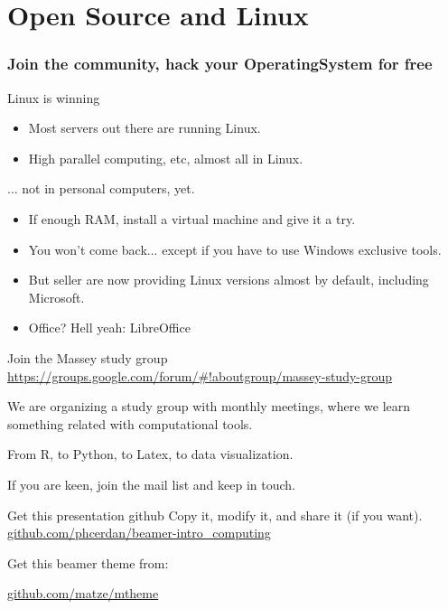 \documentclass[9pt]{beamer}
\begin{document}
\section{Open Source and Linux}
\begin{frame}
  \frametitle{Join the community, hack your OperatingSystem for free}
  \begin{alertblock}{Linux is winning}
    \begin{itemize}
      \item Most servers out there are running Linux.
      \item High parallel computing, etc, almost all in Linux.
    \end{itemize}
  \end{alertblock}
  \begin{alertblock}{... not in personal computers, yet.}
    \begin{itemize}
      \item If enough RAM, install a virtual machine and give it a try.
      \item You won't come back... except if you have to use Windows exclusive tools.
      \item But seller are now providing Linux versions almost by default, including Microsoft.
      \item Office? Hell yeah: LibreOffice
    \end{itemize}
  \end{alertblock}
\end{frame}

\begin{frame}{Join the Massey study group}
  \url{https://groups.google.com/forum/#!aboutgroup/massey-study-group}

  We are organizing a study group with monthly meetings, where we learn something related with computational tools.

  From R, to Python, to Latex, to data visualization.

  If you are keen, join the mail list and keep in touch.

\end{frame}

\begin{frame}{Get this presentation github}
  Copy it, modify it, and share it (if you want). \url{github.com/phcerdan/beamer-intro_computing}

  \vspace{2mm}
  Get this beamer theme from:

  \begin{center}\url{github.com/matze/mtheme}\end{center}

  \begin{center}\ccbysa\end{center}

\end{frame}
%
%
%   
%   
%
\end{document}

